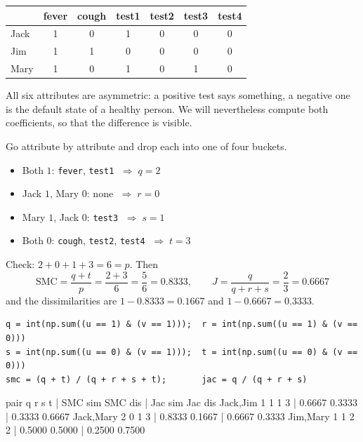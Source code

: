 \documentclass[11pt]{article}
\begin{document}
\begin{center}
\begin{tabular}{lcccccc}
  \toprule
  & fever & cough & test1 & test2 & test3 & test4 \\
  \midrule
  Jack & 1 & 0 & 1 & 0 & 0 & 0 \\
  Jim  & 1 & 1 & 0 & 0 & 0 & 0 \\
  Mary & 1 & 0 & 1 & 0 & 1 & 0 \\
  \bottomrule
\end{tabular}
\end{center}

All six attributes are asymmetric: a positive test says something, a negative
one is the default state of a healthy person. We will nevertheless compute
both coefficients, so that the difference is visible.

\begin{worked}
Go attribute by attribute and drop each into one of four buckets.
\begin{itemize}[leftmargin=*,topsep=2pt]
  \item Both $1$: \texttt{fever}, \texttt{test1} $\;\Rightarrow\; q = 2$
  \item Jack $1$, Mary $0$: none $\;\Rightarrow\; r = 0$
  \item Mary $1$, Jack $0$: \texttt{test3} $\;\Rightarrow\; s = 1$
  \item Both $0$: \texttt{cough}, \texttt{test2}, \texttt{test4}
    $\;\Rightarrow\; t = 3$
\end{itemize}
Check: $2 + 0 + 1 + 3 = 6 = p$. \quad Then
\[
  \mathrm{SMC} = \frac{q+t}{p} = \frac{2+3}{6} = \frac{5}{6} = 0.8333,
  \qquad
  J = \frac{q}{q+r+s} = \frac{2}{3} = 0.6667
\]
and the dissimilarities are $1 - 0.8333 = 0.1667$ and
$1 - 0.6667 = 0.3333$.
\end{worked}

\begin{lstlisting}
q = int(np.sum((u == 1) & (v == 1)));  r = int(np.sum((u == 1) & (v == 0)))
s = int(np.sum((u == 0) & (v == 1)));  t = int(np.sum((u == 0) & (v == 0)))
smc = (q + t) / (q + r + s + t);       jac = q / (q + r + s)
\end{lstlisting}
\begin{codeout}
pair           q   r   s   t |   SMC sim   SMC dis |   Jac sim   Jac dis
Jack,Jim       1   1   1   3 |    0.6667    0.3333 |    0.3333    0.6667
Jack,Mary      2   0   1   3 |    0.8333    0.1667 |    0.6667    0.3333
Jim,Mary       1   1   2   2 |    0.5000    0.5000 |    0.2500    0.7500
\end{codeout}
\end{document}
